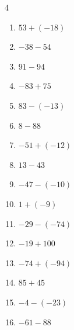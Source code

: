 \begin{multicols}{4}
\begin{enumerate}
  \item $53+(-18)$

        \phantom{$=35$}

  \item $-38-54$

        \phantom{$=-92$}

  \item $91-94$

        \phantom{$=-3$}

  \item $-83+75$

        \phantom{$=-8$}

  \item $83-(-13)$

        \phantom{$=96$}

  \item $8-88$

        \phantom{$=-80$}

\columnbreak %

  \item $-51+(-12)$

        \phantom{$=-63$}

  \item $13-43$

        \phantom{$=-30$}

  \item $-47-(-10)$

        \phantom{$=-37$}

  \item $1+(-9)$

        \phantom{$=-8$}

  \item $-29-(-74)$

        \phantom{$=45$}

  \item $-19+100$

        \phantom{$=81$}

  \item $-74+(-94)$

        \phantom{$=-168$}

  \item $85+45$

        \phantom{$=130$}

  \item $-4-(-23)$

        \phantom{$=19$}

  \item $-61-88$


\end{enumerate}
\end{multicols}
